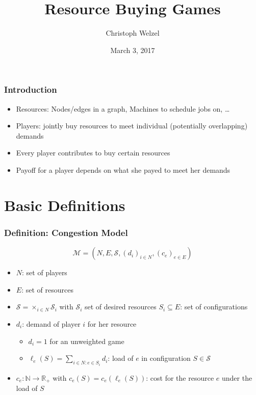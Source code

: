 \documentclass{beamer}
\title{Resource Buying Games}
\author[C. Welzel]{Christoph Welzel}
\date{March 3, 2017}
\newcommand{\tupel}[1]{\left(#1\right)}
\begin{document}

\maketitle

\begin{frame}
  \frametitle{Introduction}
    \begin{itemize}
      \item Resources: Nodes/edges in a graph, Machines to schedule jobs on,
        \dots
      \item Players: jointly buy resources to meet individual
        (potentially overlapping) demands
      \item<2-> Every player contributes to buy certain resources
      \item<3-> Payoff for a player depends on what she payed to meet her demands
    \end{itemize}
\end{frame}

\section{Basic Definitions}
\begin{frame}
  \frametitle{Definition: Congestion Model}
  \begin{equation*}
    \mathcal{M} = \tupel{N, E, \mathcal{S}, \left(d_{i}\right)_{i\in N},
    \left(c_{e}\right)_{e\in E}}
  \end{equation*}
  \vspace{-1cm}
  \begin{itemize}
    \item $N$: set of players
    \item<2-> $E$: set of resources
    \item<3-> $\mathcal{S} = \times_{i\in N}\mathcal{S}_{i}$ with $\mathcal{S}_{i}$
      set of desired resources $S_{i}\subseteq E$: set of configurations
    \item<4-> $d_{i}$: demand of player $i$ for her resource
      \begin{itemize}
        \item<4-> $d_{i} = 1$ for an unweighted game
        \item<4-> $\ell_{e}(S) = \sum_{i\in N:e\in S_{i}}d_{i}$: load of $e$
          in configuration $S\in\mathcal{S}$
      \end{itemize}
    \item<5-> $c_{e}:\mathbb{N}\rightarrow\mathbb{R}_{+}$ with
      $c_{e}(S) = c_{e}(\ell_{e}(S))$: cost for the resource $e$ under the load
      of $S$
  \end{itemize}
\end{frame}
\end{document}
